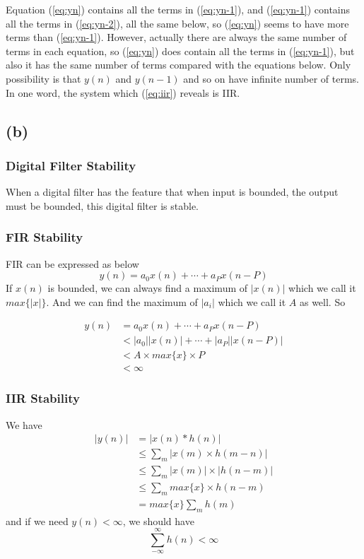\documentclass{article}
\begin{document}
Equation (\ref{eq:yn}) contains all the terms in (\ref{eq:yn-1}), and (\ref{eq:yn-1}) contains all the terms in (\ref{eq:yn-2}), all the same below, so (\ref{eq:yn}) seems to have more terms than (\ref{eq:yn-1}). However, actually there are always the same number of terms in each equation, so (\ref{eq:yn}) does contain all the terms in (\ref{eq:yn-1}), but also it has the same number of terms compared with the equations below. Only possibility is that $y(n)$ and $y(n - 1)$ and so on have infinite number of terms. In one word, the system which (\ref{eq:iir}) reveals is IIR.
\subsection{(b)}
\subsubsection{Digital Filter Stability}
When a digital filter has the feature that when input is bounded, the output must be bounded, this digital filter is stable.
\subsubsection{FIR Stability}
FIR can be expressed as below
$$
y(n) = a_0x(n) + \cdots + a_Px(n - P)
$$
If $x(n)$ is bounded, we can always find a maximum of $|x(n)|$ which we call it $max\{ |x| \}$. And we can find the maximum of $|a_i|$ which we call it $A$ as well. So

\begin{align*}
y(n)  &= a_0x(n) + \cdots + a_Px(n - P) \\ 
&< |a_0||x(n)| + \cdots + |a_P||x(n - P)| \\ 
&< A\times max\{ x \} \times P \\ 
&< \infty
\end{align*}

\subsubsection{IIR Stability}
We have
\begin{align*}
	|y(n)| &= |x(n) * h(n)| \\ 
	& \leq \sum_{m} |x(m) \times h(m - n)| \\ 
	& \leq \sum_{m} |x(m)| \times |h(n - m)| \\ 
	& \leq \sum_{m} max\{ x \} \times h(n - m) \\ 
	& = max\{ x \}  \sum_{m} h(m)
\end{align*}
and if we need $y(n) < \infty$, we should have
\begin{equation}
\sum_{- \infty}^{\infty} h(n) < \infty
\label{eq:limit}
\end{equation}
\end{document}
